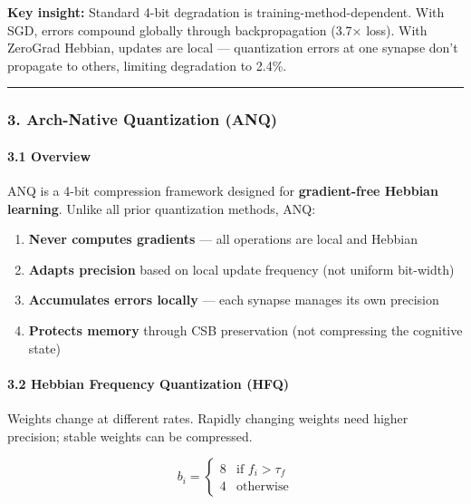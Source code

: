 \documentclass[
  11pt,
  a4paper,
]{article}
\providecommand{\tightlist}{%
  \setlength{\itemsep}{0pt}\setlength{\parskip}{0pt}}
\begin{document}
\textbf{Key insight:} Standard 4-bit degradation is
training-method-dependent. With SGD, errors compound globally through
backpropagation (3.7× loss). With ZeroGrad Hebbian, updates are local
--- quantization errors at one synapse don't propagate to others,
limiting degradation to 2.4\%.

\begin{center}\rule{0.5\linewidth}{0.5pt}\end{center}

\subsubsection{3. Arch-Native Quantization
(ANQ)}\label{arch-native-quantization-anq}

\paragraph{3.1 Overview}\label{overview-1}

ANQ is a 4-bit compression framework designed for \textbf{gradient-free
Hebbian learning}. Unlike all prior quantization methods, ANQ:

\begin{enumerate}
\def\labelenumi{\arabic{enumi}.}
\tightlist
\item
  \textbf{Never computes gradients} --- all operations are local and
  Hebbian
\item
  \textbf{Adapts precision} based on local update frequency (not uniform
  bit-width)
\item
  \textbf{Accumulates errors locally} --- each synapse manages its own
  precision
\item
  \textbf{Protects memory} through CSB preservation (not compressing the
  cognitive state)
\end{enumerate}

\paragraph{3.2 Hebbian Frequency Quantization
(HFQ)}\label{hebbian-frequency-quantization-hfq}

Weights change at different rates. Rapidly changing weights need higher
precision; stable weights can be compressed.

\[
b_i = \begin{cases}
8 & \text{if } f_i > \tau_f \\
4 & \text{otherwise}
\end{cases}
\]
\end{document}
